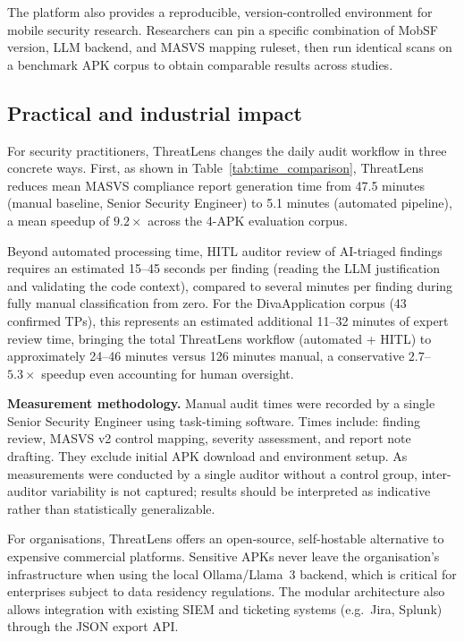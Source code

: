 \documentclass[preprint,12pt,a4paper]{elsarticle}
\begin{document}
The platform also provides a reproducible, version-controlled environment for mobile
security research. Researchers can pin a specific combination of MobSF version, LLM
backend, and MASVS mapping ruleset, then run identical scans on a benchmark APK
corpus to obtain comparable results across studies.

\subsection{Practical and industrial impact}

For security practitioners, ThreatLens changes the daily audit workflow in three
concrete ways. First, as shown in Table~\ref{tab:time_comparison}, ThreatLens reduces
mean MASVS compliance report generation time from 47.5 minutes (manual baseline,
Senior Security Engineer) to 5.1 minutes (automated pipeline), a mean speedup of
$9.2\times$ across the 4-APK evaluation corpus.

Beyond automated processing time, HITL auditor review of AI-triaged findings requires an estimated 15--45 seconds per finding (reading the LLM justification and validating the code context), compared to several minutes per finding during fully manual classification from zero. For the DivaApplication corpus (43 confirmed TPs), this represents an estimated additional 11--32 minutes of expert review time, bringing the total ThreatLens workflow (automated + HITL) to approximately 24--46 minutes versus 126 minutes manual, a conservative $2.7$--$5.3\times$ speedup even accounting for human oversight.

\textbf{Measurement methodology.} Manual audit times were recorded by a single Senior Security Engineer using task-timing software. Times include: finding review, MASVS v2 control mapping, severity assessment, and report note drafting. They exclude initial APK download and environment setup. As measurements were conducted by a single auditor without a control group, inter-auditor variability is not captured; results should be interpreted as indicative rather than statistically generalizable.

For organisations, ThreatLens offers an open-source, self-hostable alternative to
expensive commercial platforms. Sensitive APKs never leave the organisation's
infrastructure when using the local Ollama/Llama~3 backend, which is critical for
enterprises subject to data residency regulations. The modular architecture also
allows integration with existing SIEM and ticketing systems (e.g.\ Jira, Splunk)
through the JSON export API.
\end{document}
